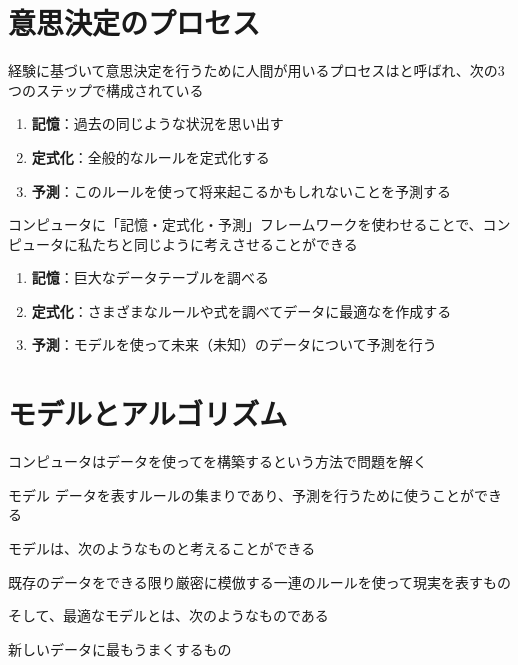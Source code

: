 \documentclass[../../../topic_machine-learning]{subfiles}
\begin{document}
\sectionline
\section{意思決定のプロセス}

経験に基づいて意思決定を行うために人間が用いるプロセスはと呼ばれ、次の3つのステップで構成されている

\begin{enumerate}
  \item \textbf{記憶}：過去の同じような状況を思い出す
  \item \textbf{定式化}：全般的なルールを定式化する
  \item \textbf{予測}：このルールを使って将来起こるかもしれないことを予測する
\end{enumerate}

コンピュータに「記憶・定式化・予測」フレームワークを使わせることで、コンピュータに私たちと同じように考えさせることができる

\begin{enumerate}
  \item \textbf{記憶}：巨大なデータテーブルを調べる
  \item \textbf{定式化}：さまざまなルールや式を調べてデータに最適なを作成する
  \item \textbf{予測}：モデルを使って未来（未知）のデータについて予測を行う
\end{enumerate}

\sectionline
\section{モデルとアルゴリズム}

コンピュータはデータを使ってを構築するという方法で問題を解く

\begin{definition}{モデル}
  データを表すルールの集まりであり、予測を行うために使うことができる
\end{definition}

モデルは、次のようなものと考えることができる
\begin{shaded}
  既存のデータをできる限り厳密に模倣する一連のルールを使って現実を表すもの
\end{shaded}

\br

そして、最適なモデルとは、次のようなものである
\begin{shaded}
  新しいデータに最もうまくするもの
\end{shaded}
\end{document}
